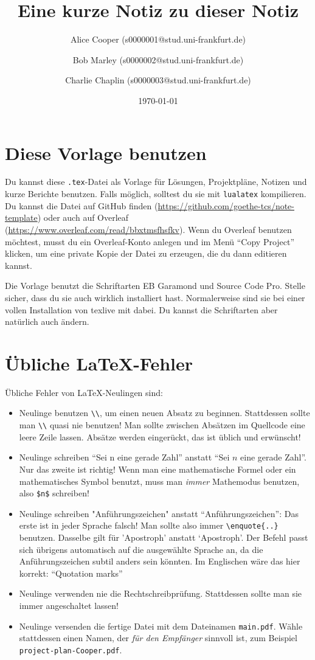 \documentclass[a4paper,11pt,oneside,ngerman]{scrartcl}
\title{Eine kurze Notiz zu dieser Notiz}
\author{%
  Alice Cooper (s0000001@stud.uni-frankfurt.de)%
  \and Bob Marley (s0000002@stud.uni-frankfurt.de)%
  \and Charlie Chaplin (s0000003@stud.uni-frankfurt.de)%
}
\date{\today}
\begin{document}
\maketitle

\section*{Diese Vorlage benutzen}

Du kannst diese \texttt{.tex}-Datei als Vorlage für Lösungen, Projektpläne, Notizen und kurze Berichte benutzen.
Falls möglich, solltest du sie mit \verb|lualatex| kompilieren.
Du kannst die Datei auf GitHub finden (\url{https://github.com/goethe-tcs/note-template}) oder auch auf Overleaf (\url{https://www.overleaf.com/read/bbxtmsfhsfkv}). Wenn du Overleaf benutzen möchtest, musst du ein Overleaf-Konto anlegen und im Menü \hyphenquote{english}{Copy Project} klicken, um eine private Kopie der Datei zu erzeugen, die du dann editieren kannst.

Die Vorlage benutzt die Schriftarten EB Garamond und Source Code Pro. Stelle sicher, dass du sie auch wirklich installiert hast. Normalerweise sind sie bei einer vollen Installation von texlive mit dabei. Du kannst die Schriftarten aber natürlich auch ändern.

\section*{Übliche \LaTeX{}-Fehler}

Übliche Fehler von \LaTeX{}-Neulingen sind:
\begin{itemize}
  \item Neulinge benutzen \verb|\\|, um einen neuen Absatz zu beginnen. Stattdessen sollte man \verb|\\| quasi nie benutzen!
  Man sollte zwischen Absätzen im Quellcode eine leere Zeile lassen. Absätze werden eingerückt, das ist üblich und erwünscht!
  \item Neulinge schreiben \enquote{Sei n eine gerade Zahl} anstatt \enquote{Sei $n$ eine gerade Zahl}. Nur das zweite ist richtig! Wenn man eine mathematische Formel oder ein mathematisches Symbol benutzt, muss man \emph{immer} Mathemodus benutzen, also \verb|$n$| schreiben!
  \item Neulinge schreiben "Anführungszeichen" anstatt \enquote{Anführungszeichen}: Das erste ist in jeder Sprache falsch! Man sollte also immer \verb|\enquote{..}| benutzen.
  Dasselbe gilt für 'Apostroph' anstatt \enquote*{Apostroph}.
  Der Befehl passt sich übrigens automatisch auf die ausgewählte Sprache an, da die Anführungszeichen subtil anders sein könnten.
  Im Englischen wäre das hier korrekt:
  \foreignlanguage{english}{\enquote{Quotation marks}}
  \item Neulinge verwenden nie die Rechtschreibprüfung. Stattdessen sollte man sie immer angeschaltet lassen!
  \item Neulinge versenden die fertige Datei mit dem Dateinamen \verb|main.pdf|. Wähle stattdessen einen Namen, der \emph{für den Empfänger} sinnvoll ist, zum Beispiel \verb|project-plan-Cooper.pdf|.
\end{itemize}
\end{document}
